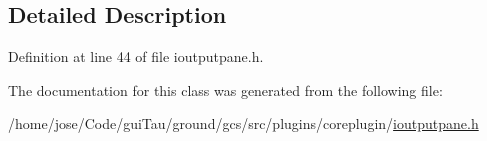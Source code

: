 \subsection{Detailed Description}


Definition at line 44 of file ioutputpane.\-h.



The documentation for this class was generated from the following file\-:\begin{DoxyCompactItemize}
\item 
/home/jose/\-Code/gui\-Tau/ground/gcs/src/plugins/coreplugin/\hyperlink{ioutputpane_8h}{ioutputpane.\-h}\end{DoxyCompactItemize}

